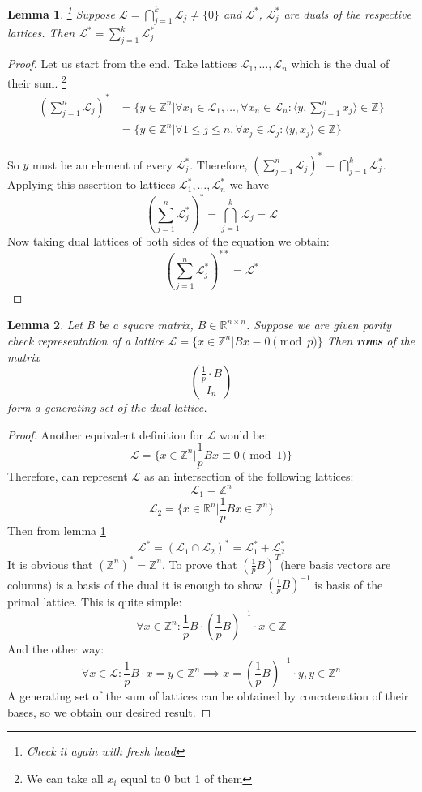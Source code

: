 \documentclass[12pt]{article}
\newcommand{\ZZ}{\mathbb{Z}}
\newcommand{\LL}{\mathcal{L}}
\newtheorem{lemma}{Lemma}
\begin{document}
\begin{lemma}
    \footnote{Check it again with fresh head}
    \label{lemma_intersection}
    Suppose $\LL = \bigcap_{j=1}^{k} \LL_{j} \neq \{0\}$ and $\LL^{*}$, $\LL_{j}^{*}$ are duals of the respective lattices. Then $\LL^{*} = \sum_{j=1}^{k} \LL_{j}^{*}$
\end{lemma}
\begin{proof}
    Let us start from the end. Take lattices $\LL_{1}, \dots, \LL_{n}$ which is the dual of their sum.
    \footnote{We can take all $x_{i}$ equal to 0 but 1 of them}
\[
\begin{split}
(\sum_{j=1}^{n}\LL_j)^{*} & = \{y \in \ZZ^{n} | \forall x_{1} \in \LL_1, \dots, \forall x_{n} \in \LL_n: \langle y, \sum_{j=1}^{n} x_{j} \rangle \in \ZZ \} \\
& = \{y \in \ZZ^{n} | \forall 1 \leq j \leq n, \forall x_{j} \in \LL_j: \langle y,  x_{j} \rangle \in \ZZ \}
\end{split}
\]

So $y$ must be an element of every $\LL_{j}^{*}$. Therefore, $(\sum_{j=1}^{n}\LL_j)^{*} = \bigcap_{j=1}^{k} \LL_{j}^{*}$. Applying this assertion to lattices $\LL_{1}^{*}, \dots, \LL_{n}^{*}$ we have
\[
(\sum_{j=1}^{n}\LL_j^{*})^{*} = \bigcap_{j=1}^{k} \LL_{j} = \LL
\]
Now taking dual lattices of both sides of the equation we obtain:
\[
(\sum_{j=1}^{n}\LL_j^{*})^{**} = \LL^{*}
\]

\end{proof}

\begin{lemma}\label{lemma:dual_gen_set}
    Let B be a square matrix, $B \in \mathbb{R}^{n \times n}$. Suppose we are given parity check representation of a lattice $\LL = \{x \in \ZZ^{n} | Bx \equiv 0 \pmod{p}\}$
    Then \textbf{rows} of the matrix
    \[
    \binom{\frac{1}{p} \cdot B}{I_{n}}
    \]
    form a generating set of the dual lattice.
\end{lemma}
\begin{proof}
    Another equivalent definition for $\LL$ would be:
    \[
        \LL  = \{x \in \ZZ^{n} | \frac{1}{p}Bx \equiv 0 \pmod{1}\}
    \]
Therefore, can represent $\LL$ as an intersection of the following lattices:
\[
    \LL_{1}  = \ZZ^{n}
\]
\[
    \LL_{2}  = \{x \in \mathbb{R}^{n} | \frac{1}{p}Bx \in \ZZ^{n} \}
\]
Then from lemma \ref{lemma_intersection}
\[
    \LL^{*}  = (\LL_{1} \cap \LL_{2})^{*} = \LL_{1}^{*} + \LL_{2}^{*}
\]
It is obvious that $(\ZZ^{n})^{*} = \ZZ^{n}$. To prove that $(\frac{1}{p}B)^{T}$(here basis vectors are columns) is a basis of the dual it is enough to show $(\frac{1}{p}B)^{-1}$ is basis of the primal lattice. This is quite simple:
\[
    \forall x \in \ZZ^{n}: \frac{1}{p}B \cdot (\frac{1}{p}B)^{-1} \cdot x \in \ZZ
\]
And the other way:
\[
    \forall x \in \LL: \frac{1}{p}B \cdot x = y \in \ZZ^{n} \implies x = (\frac{1}{p}B)^{-1} \cdot y , y \in \ZZ^{n}
\]
A generating set of the sum of lattices can be obtained by concatenation of their bases, so we obtain our desired result.
\end{proof}
\end{document}
